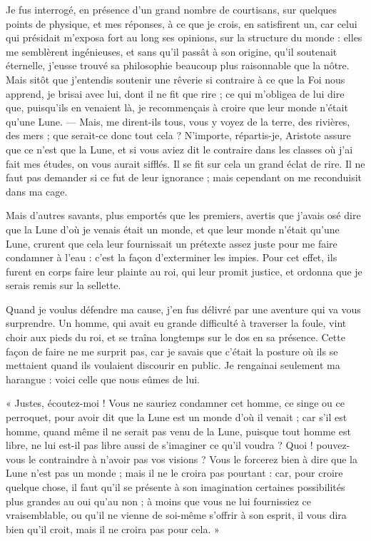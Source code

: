 \documentclass[a4paper, 11pt, oneside, landscape]{article}
\begin{document}
Je fus interrogé, en présence d'un grand nombre de courtisans, sur quelques points de physique, et mes réponses, à ce que je crois, en satisfirent un, car celui qui présidait m'exposa fort au long ses opinions, sur la structure du monde : elles me semblèrent ingénieuses, et sans qu'il passât à son origine, qu'il soutenait éternelle, j'eusse trouvé sa philosophie beaucoup plus raisonnable que la nôtre. Mais sitôt que j'entendis soutenir une rêverie si contraire à ce que la Foi nous apprend, je brisai avec lui, dont il ne fit que rire ; ce qui m'obligea de lui dire que, puisqu'ils en venaient là, je recommençais à croire que leur monde n'était qu'une Lune. --- Mais, me dirent-ils tous, vous y voyez de la terre, des rivières, des mers ; que serait-ce donc tout cela ? N'importe, répartis-je, Aristote assure que ce n'est que la Lune, et si vous aviez dit le contraire dans les classes où j'ai fait mes études, on vous aurait sifflés. Il se fit sur cela un grand éclat de rire. Il ne faut pas demander si ce fut de leur ignorance ; mais cependant on me reconduisit dans ma cage.

Mais d'autres savants, plus emportés que les premiers, avertis que j'avais osé dire que la Lune d'où je venais était un monde, et que leur monde n'était qu'une Lune, crurent que cela leur fournissait un prétexte assez juste pour me faire condamner à l'eau : c'est la façon d'exterminer les impies. Pour cet effet, ils furent en corps faire leur plainte au roi, qui leur promit justice, et ordonna que je serais remis sur la sellette.

Quand je voulus défendre ma cause, j'en fus délivré par une aventure qui va vous surprendre. Un homme, qui avait eu grande difficulté à traverser la foule, vint choir aux pieds du roi, et se traîna longtemps sur le dos en sa présence. Cette façon de faire ne me surprit pas, car je savais que c'était la posture où ils se mettaient quand ils voulaient discourir en public. Je rengainai seulement ma harangue : voici celle que nous eûmes de lui.

« Justes, écoutez-moi ! Vous ne sauriez condamner cet homme, ce singe ou ce perroquet, pour avoir dit que la Lune est un monde d'où il venait ; car s'il est homme, quand même il ne serait pas venu de la Lune, puisque tout homme est libre, ne lui est-il pas libre aussi de s'imaginer ce qu'il voudra ? Quoi ! pouvez-vous le contraindre à n'avoir pas vos visions ? Vous le forcerez bien à dire que la Lune n'est pas un monde ; mais il ne le croira pas pourtant : car, pour croire quelque chose, il faut qu'il se présente à son imagination certaines possibilités plus grandes au oui qu'au non ; à moins que vous ne lui fournissiez ce vraisemblable, ou qu'il ne vienne de soi-même s'offrir à son esprit, il vous dira bien qu'il croit, mais il ne croira pas pour cela. »
\end{document}
